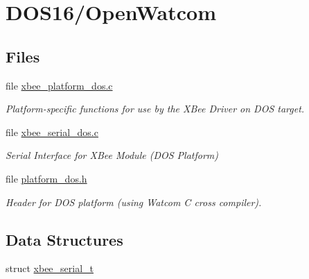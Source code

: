 \hypertarget{group__hal__dos}{\section{D\-O\-S16/\-Open\-Watcom}
\label{group__hal__dos}
}
\subsection*{Files}
\begin{DoxyCompactItemize}
\item 
file \hyperlink{xbee__platform__dos_8c}{xbee\-\_\-platform\-\_\-dos.\-c}
\begin{DoxyCompactList}\small\item\em Platform-\/specific functions for use by the X\-Bee Driver on D\-O\-S target. \end{DoxyCompactList}\item 
file \hyperlink{xbee__serial__dos_8c}{xbee\-\_\-serial\-\_\-dos.\-c}
\begin{DoxyCompactList}\small\item\em Serial Interface for X\-Bee Module (D\-O\-S Platform) \end{DoxyCompactList}\item 
file \hyperlink{platform__dos_8h}{platform\-\_\-dos.\-h}
\begin{DoxyCompactList}\small\item\em Header for D\-O\-S platform (using Watcom C cross compiler). \end{DoxyCompactList}\end{DoxyCompactItemize}
\subsection*{Data Structures}
\begin{DoxyCompactItemize}
\item 
struct \hyperlink{structxbee__serial__t}{xbee\-\_\-serial\-\_\-t}
\end{DoxyCompactItemize}
